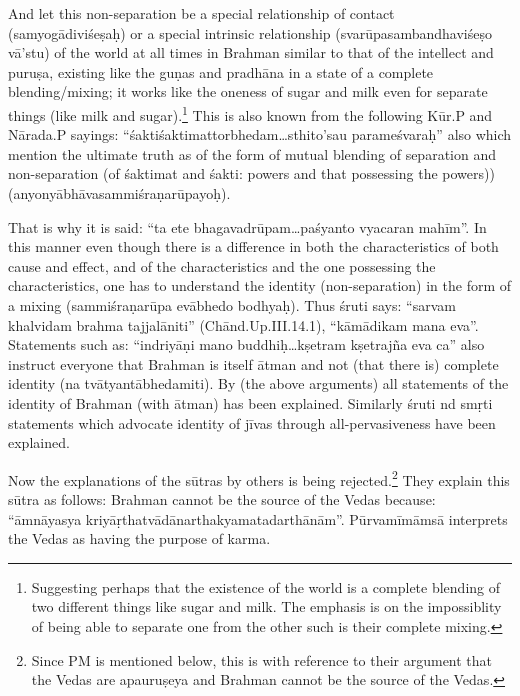 \vskip 2pt

And let this non-separation be a special relationship of contact (samyogādiviśeṣaḥ) or a special intrinsic relationship (svarūpasambandhaviśeṣo vā’stu) of the world at all times in Brahman similar to that of the intellect and puruṣa, existing like the guṇas and pradhāna in a state of a complete blending/mixing; it works like the oneness of sugar and milk even for separate things (like milk and sugar).\footnote{Suggesting perhaps that the existence of the world is a complete blending of two different things like sugar and milk. The emphasis is on the impossiblity of being able to separate one from the other such is their complete mixing.} This is also known from the following Kūr.P and Nārada.P sayings: “śaktiśaktimattorbhedam…sthito’sau parameśvaraḥ” also which mention the ultimate truth as of the form of mutual blending of separation and non-separation (of śaktimat and śakti: powers and that possessing the powers)) (anyonyābhāvasammiśraṇarūpayoḥ).

\vskip 2pt

That is why it is said: “ta ete bhagavadrūpam…paśyanto vyacaran mahīm”. In this manner even though there is a difference in both the characteristics of both cause and effect, and of the characteristics and the one possessing the characteristics, one has to understand the identity (non-separation) in the form of a mixing (sammiśraṇarūpa evābhedo bodhyaḥ). Thus śruti says: “sarvam khalvidam brahma tajjalāniti” (Chānd.Up.III.14.1), “kāmādikam mana eva”. Statements such as: “indriyāṇi mano buddhiḥ…kṣetram kṣetrajña eva ca” also instruct everyone that Brahman is itself ātman and not (that there is) complete identity (na tvātyantābhedamiti). By (the above arguments) all statements of the identity of Brahman (with ātman) has been explained. Similarly śruti nd smṛti statements which advocate identity of jīvas through all-pervasiveness have been explained.

\vskip 2pt

Now the explanations of the sūtras by others is being rejected.\footnote{Since PM is mentioned below, this is with reference to their argument that the Vedas are apauruṣeya and Brahman cannot be the source of the Vedas.} They explain this sūtra as follows: Brahman cannot be the source of the Vedas because: “āmnāyasya kriyāṛthatvādānarthakyamatadarthā\-nām”. Pūrvamīmāmsā interprets the Vedas as having the purpose of karma. 

